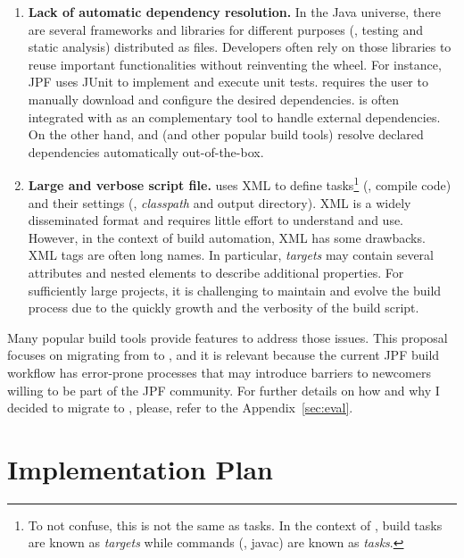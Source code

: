 \documentclass{article}
\begin{document}
\begin{enumerate}

\item \textbf{Lack of automatic dependency resolution.}
In the Java universe, there are several frameworks and libraries for different
purposes (\eg, testing and static analysis) distributed as \jar{} files.
Developers often rely on those libraries to reuse important functionalities
without reinventing the wheel.
For instance, JPF uses JUnit to implement and execute unit tests.
\ant{} requires the user to manually download and configure the desired
dependencies.
\ant{} is often integrated with \ivy{}\cite{page:ivy} as an complementary
tool to handle external dependencies.
On the other hand, \gradle{} and \maven{} (and other popular build tools)
resolve declared dependencies automatically out-of-the-box.

\item \textbf{Large and verbose script file.}
\ant{} uses XML to define tasks\footnote{To not confuse, this is not the same
as \ant{} tasks. In the context of \ant{}, build tasks are known as
\emph{targets} while commands (\eg, javac) are known as \emph{tasks}.} (\eg,
compile code) and their settings (\eg, \emph{classpath} and output directory).
XML is a widely disseminated format and requires little effort to understand
and use.
However, in the context of build automation, XML has some drawbacks.
XML tags are often long names.
In particular, \ant{} \emph{targets} may contain several attributes and nested
elements to describe additional properties.
For sufficiently large projects, it is challenging to maintain and evolve the
build process due to the quickly growth and the verbosity of the build script.

\end{enumerate}

Many popular build tools provide features to address those issues.
This proposal focuses on migrating from \ant{} to \gradle{}, and it is relevant
because the current JPF build workflow has error-prone processes that may
introduce barriers to newcomers willing to be part of the JPF community.
For further details on how and why I decided to migrate to \gradle{}, please,
refer to the Appendix~\ref{sec:eval}.

\section{Implementation Plan}
\label{sec:plan}

\end{document}
